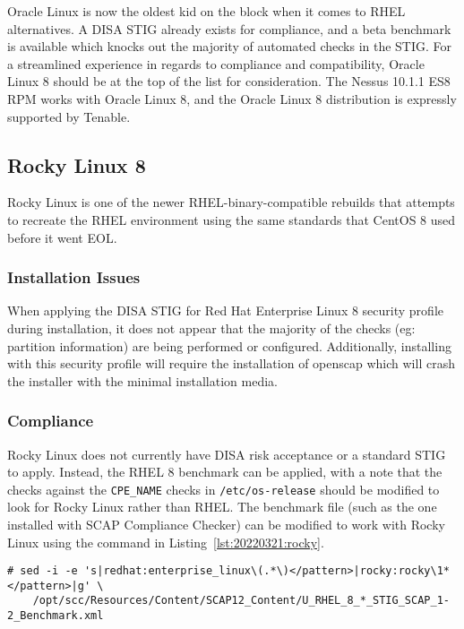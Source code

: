 Oracle Linux is now the oldest kid on the block when it comes to RHEL alternatives. A DISA STIG already exists for compliance, and a beta benchmark is available which knocks out the majority of automated checks in the STIG. For a streamlined experience in regards to compliance and compatibility, Oracle Linux 8 should be at the top of the list for consideration. The Nessus 10.1.1 ES8 RPM works with Oracle Linux 8, and the Oracle Linux 8 distribution is expressly supported by Tenable.

\subsection{Rocky Linux 8}
Rocky Linux is one of the newer RHEL-binary-compatible rebuilds that attempts to recreate the RHEL environment using the same standards that CentOS 8 used before it went EOL.

\subsubsection{Installation Issues}
When applying the DISA STIG for Red Hat Enterprise Linux 8 security profile during installation, it does not appear that the majority of the checks (eg: partition information) are being performed or configured. Additionally, installing with this security profile will require the installation of openscap which will crash the installer with the minimal installation media.

\subsubsection{Compliance}
Rocky Linux does not currently have DISA risk acceptance or a standard STIG to apply. Instead, the RHEL 8 benchmark can be applied, with a note that the checks against the \texttt{CPE\_NAME} checks in \texttt{/etc/os-release} should be modified to look for Rocky Linux rather than RHEL. The benchmark file (such as the one installed with SCAP Compliance Checker) can be modified to work with Rocky Linux using the command in Listing~\ref{lst:20220321:rocky}.

\begin{lstlisting}[caption={Modify RHEL Benchmark for Rocky Linux},captionpos=b,style=BashStyle,basicstyle=\small,label={lst:20220321:rocky},literate=*{-}{-}1,breaklines=true]
# sed -i -e 's|redhat:enterprise_linux\(.*\)</pattern>|rocky:rocky\1*</pattern>|g' \
	/opt/scc/Resources/Content/SCAP12_Content/U_RHEL_8_*_STIG_SCAP_1-2_Benchmark.xml
\end{lstlisting}


